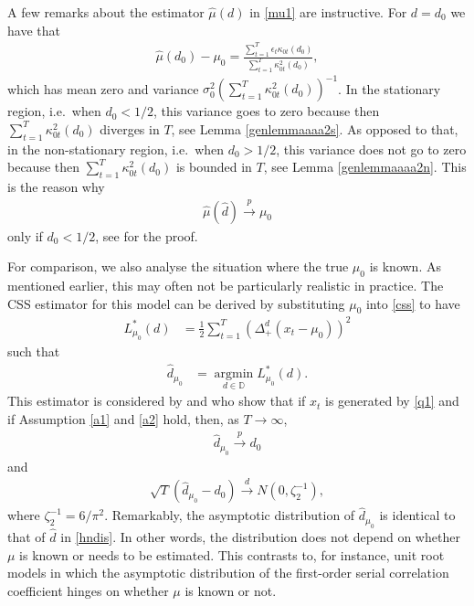 {{A few remarks about the estimator $\hat{\mu}(d)$ in \eqref{mu1} are instructive. For $d = d_0$ we have that 
\begin{align*}
    \hat{\mu}(d_0)-\mu_0 = \frac{\sum_{t = 1}^T \epsilon_t\kappa_{0t}(d_0)}{\sum_{t = 1}^T \kappa^2_{0t}(d_0)},
\end{align*}
which has mean zero and variance $\sigma_0^2 (\sum_{t = 1}^T \kappa^2_{0t}(d_0))^{-1}$. In the stationary region, i.e.\ when $d_0 < 1/2$, this variance goes to zero because then $\sum_{t = 1}^T \kappa^2_{0t}(d_0)$ diverges in $T$,
see Lemma \ref{genlemmaaaa2s}. As opposed to that, in the non-stationary region, i.e.\ when $d_0 > 1/2$, this variance does not go to zero because then $\sum_{t = 1}^T \kappa^2_{0t}(d_0)$ is bounded in $T$, see Lemma \ref{genlemmaaaa2n}. This
is the reason why
\begin{align}
\hat{\mu}(\hat{d}) \xrightarrow{p} \mu_0
\end{align}
only if $d_0 < 1/2$, see \textcite[Corollary 1]{hualde2020truncated} for the proof.

For comparison, we also analyse the situation where the true $\mu_0$ is known. As mentioned earlier, this may often not be particularly realistic in practice. The CSS estimator for this model can be derived by substituting $\mu_0$
into \eqref{css} to have 
\begin{align}
 L^*_{\mu_0}(d) &= \frac{1}{2} \sum_{t = 1}^T \left(  \Delta_{+}^{d} (x_t-\mu_0 ) \right)^2 \label{Lknownm}
\end{align}
such that
\begin{align}
     \hat{d}_{\mu_0} &= \operatorname*{argmin}_{d \in \mathbb{D}}  L^*_{\mu_0}(d) . \label{CSSknown} 
\end{align}
This estimator is considered by \textcite{hualde2011gaussian} and \textcite{nielsen2015asymptotics} who show that if $x_t$ is generated by \eqref{q1} and if Assumption \ref{a1} and \ref{a2} hold, then, as $T \rightarrow \infty$, 
\begin{align}
    \hat{d}_{\mu_0} \xrightarrow{p} d_0
\end{align}
and
\begin{align}
    \sqrt{T}(\hat{d}_{\mu_0} - d_0) \xrightarrow{d} N(0,\zeta^{-1}_2), \label{hndisknown}
\end{align}
where $\zeta^{-1}_2 = 6/\pi^2$. Remarkably, the asymptotic distribution of $\hat{d}_{\mu_0}$ is identical to that of $\hat{d}$ in \eqref{hndis}. In other words, the distribution does not depend on whether $\mu$ is known or needs
to be estimated. This contrasts to, for instance, unit root models in which the asymptotic distribution of the first-order serial correlation coefficient hinges on whether $\mu$ is known or not. 




}}
